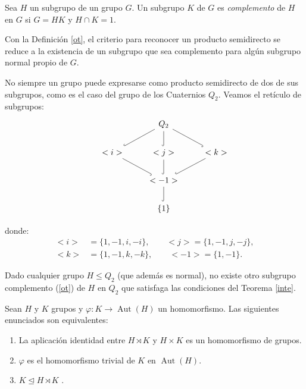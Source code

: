 \begin{definition} \label{ot}
    Sea $H$ un subgrupo de un grupo $G$. Un subgrupo $K$ de $G$ es \textit{complemento} de $H$ en $G$ si $G=HK$ y $H\cap K=1$.
\end{definition}

Con la Definición \ref{ot}, el criterio para reconocer un producto semidirecto se reduce a la existencia de un subgrupo que sea complemento para algún subgrupo normal propio de $G$.


\begin{Ejemplo} \label{Q2ret}
No siempre un grupo puede expresarse como producto semidirecto de dos de sus subgrupos, como es el caso del grupo de los Cuaternios $Q_2$. Veamos el retículo de subgrupos:
\begin{equation*}
    \begin{tikzcd}
    & & Q_2  \\
    & <i> \arrow[ur,dash,hook]
    & <j> \arrow[u,dash,hook]
    &<k> \arrow[ul,dash, hook] \\
    & & <-1> \arrow[ul,dash,hook] \arrow[u,dash,hook] \arrow[ur,dash,hook] \\
    & & \{1\}  \arrow[u, dash,hook]
    \end{tikzcd}
\end{equation*}

donde:
\begin{align*}
    <i> &= \{ 1,-1,i,-i\} , \qquad 
    <j> = \{ 1,-1,j,-j\}, \\
    <k> &= \{ 1,-1,k,-k \}, \qquad 
    <-1> = \{ 1,-1\}.
\end{align*}


Dado cualquier grupo $H\leq Q_2$ (que además es normal), no existe otro subgrupo complemento (\ref{ot}) de $H$ en $Q_2$ que satisfaga las condiciones del Teorema \ref{inte}.
\end{Ejemplo}


\begin{proposition} \label{esto}
    Sean $H$ y $K$ grupos y $\varphi \colon K \rightarrow \operatorname{Aut}(H)$ un homomorfismo. Las siguientes enunciados son equivalentes:
    \begin{enumerate}[label=(\arabic*)]
        \item La aplicación identidad entre $H \rtimes K$ y $H \times K$ es un homomorfismo de grupos. \label{item1}
        \item $\varphi$ es el homomorfismo trivial de $K$ en $\operatorname{Aut}(H)$. \label{item2}
        \item $K \trianglelefteq H \rtimes K$ \! . \label{item3}
    \end{enumerate}
\end{proposition}

